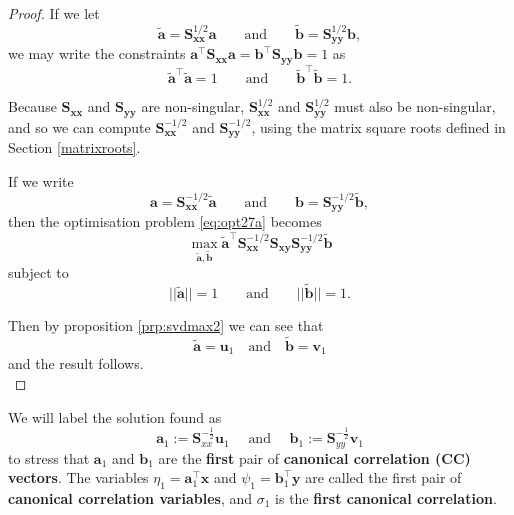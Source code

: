 \documentclass[]{book}
\theoremstyle{definition}
\theoremstyle{definition}
\theoremstyle{definition}
\theoremstyle{remark}
\begin{document}
\begin{proof}
{}If we let
\[
\tilde{\boldsymbol a}=\boldsymbol S_{\boldsymbol x\boldsymbol x}^{1/2} \boldsymbol a\qquad \text{and} \qquad \tilde{\boldsymbol b}=\boldsymbol S_{\boldsymbol y\boldsymbol y}^{1/2}\boldsymbol b,
\]
we may write the constraints \(\boldsymbol a^\top \boldsymbol S_{\boldsymbol x\boldsymbol x}\boldsymbol a=\boldsymbol b^\top \boldsymbol S_{\boldsymbol y\boldsymbol y}\boldsymbol b=1\) as
\[
\tilde{\boldsymbol a}^\top \tilde{\boldsymbol a}=1 \qquad \text{and} \qquad \tilde{\boldsymbol b}^\top \tilde{\boldsymbol b}=1.
\]

Because \(\boldsymbol S_{\boldsymbol x\boldsymbol x}\) and \(\boldsymbol S_{\boldsymbol y\boldsymbol y}\) are non-singular, \(\boldsymbol S_{\boldsymbol x\boldsymbol x}^{1/2}\) and \(\boldsymbol S_{\boldsymbol y\boldsymbol y}^{1/2}\) must also be non-singular, and so we can compute
\(\boldsymbol S_{\boldsymbol x\boldsymbol x}^{-1/2}\) and \(\boldsymbol S_{\boldsymbol y\boldsymbol y}^{-1/2}\), using the matrix square roots defined in Section \ref{matrixroots}.

If we write
\[
\boldsymbol a=\boldsymbol S_{\boldsymbol x\boldsymbol x}^{-1/2}\tilde{\boldsymbol a} \qquad \text{and} \qquad \boldsymbol b=\boldsymbol S_{\boldsymbol y\boldsymbol y}^{-1/2} \tilde{\boldsymbol b},
\]
then the optimisation problem \eqref{eq:opt27a} becomes
\[
\max_{\tilde{\boldsymbol a}, \tilde{\boldsymbol b}}
\tilde{\boldsymbol a}^\top \boldsymbol S_{\boldsymbol x\boldsymbol x}^{-1/2}\boldsymbol S_{\boldsymbol x\boldsymbol y}\boldsymbol S_{\boldsymbol y\boldsymbol y}^{-1/2} \tilde{\boldsymbol b}
\]
subject to
\[
\vert \vert \tilde{\boldsymbol a} \vert \vert =1 \qquad \text{and} \qquad \vert \vert \tilde{\boldsymbol b}\vert \vert=1.
\]

Then by proposition \ref{prp:svdmax2} we can see that
\[\tilde{\boldsymbol a} = \boldsymbol u_1 \quad \mbox{and}\quad\tilde{\boldsymbol b} = \boldsymbol v_1\]
and the result follows.\\
\end{proof}

We will label the solution found as
\[\boldsymbol a_1 := \boldsymbol S_{xx}^{-\frac{1}{2}}\boldsymbol u_1\quad \mbox{ and }\quad\boldsymbol b_1 := \boldsymbol S_{yy}^{-\frac{1}{2}}\boldsymbol v_1\]
to stress that \(\boldsymbol a_1\) and \(\boldsymbol b_1\) are the \textbf{first} pair of \textbf{canonical correlation (CC) vectors}. The variables \(\eta_1=\boldsymbol a_1^\top \boldsymbol x\) and \(\psi_1=\boldsymbol b_1^\top \boldsymbol y\) are called the first pair of \textbf{canonical correlation variables}, and \(\sigma_1\) is the \textbf{first canonical correlation}.
\end{document}

